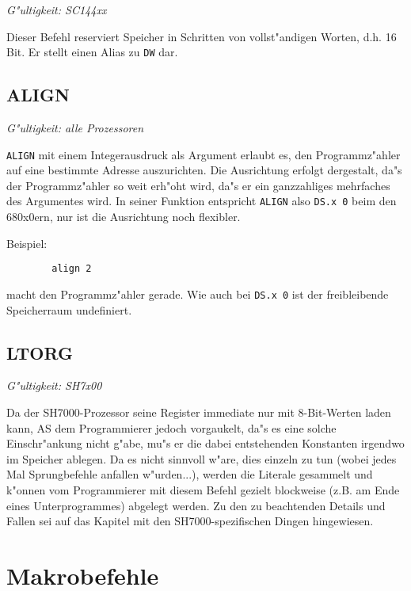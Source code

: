 \documentclass[12pt,a4paper,twoside]{report}
\makeatletter
\newcommand{\tty}[1]{{\tt #1}}
\newcommand{\ttindex}[1]{\index{#1@{\tt #1}}}
\makeatother
\begin{document}
{{\em G"ultigkeit: SC144xx}

Dieser Befehl reserviert Speicher in Schritten von vollst"andigen Worten,
d.h. 16 Bit.  Er stellt einen Alias zu {\tt DW} dar.


\subsection{ALIGN}
\ttindex{ALIGN}

{\em G"ultigkeit: alle Prozessoren}

\tty{ALIGN} mit einem Integerausdruck als Argument erlaubt es, den
Programmz"ahler auf eine bestimmte Adresse auszurichten.  Die
Ausrichtung erfolgt dergestalt, da"s der Programmz"ahler so weit
erh"oht wird, da"s er ein ganzzahliges mehrfaches des Argumentes
wird.  In seiner Funktion entspricht \tty{ALIGN} also \tty{DS.x 0}
beim den 680x0ern, nur ist die Ausrichtung noch flexibler.
\par
Beispiel:
\begin{verbatim}
        align 2
\end{verbatim}
macht den Programmz"ahler gerade.  Wie auch bei \tty{DS.x 0} ist der
freibleibende Speicherraum undefiniert.


\subsection{LTORG}
\ttindex{LTORG}

{\em G"ultigkeit: SH7x00}

Da der SH7000-Prozessor seine Register immediate nur mit 8-Bit-Werten
laden kann, AS dem Programmierer jedoch vorgaukelt, da"s es eine solche
Einschr"ankung nicht g"abe, mu"s er die dabei entstehenden Konstanten
irgendwo im Speicher ablegen.  Da es nicht sinnvoll w"are, dies einzeln
zu tun (wobei jedes Mal Sprungbefehle anfallen w"urden...), werden die
Literale gesammelt und k"onnen vom Programmierer mit diesem Befehl
gezielt blockweise (z.B. am Ende eines Unterprogrammes) abgelegt werden.
Zu den zu beachtenden Details und Fallen sei auf das Kapitel mit den
SH7000-spezifischen Dingen hingewiesen.


\section{Makrobefehle}

}
\end{document}

